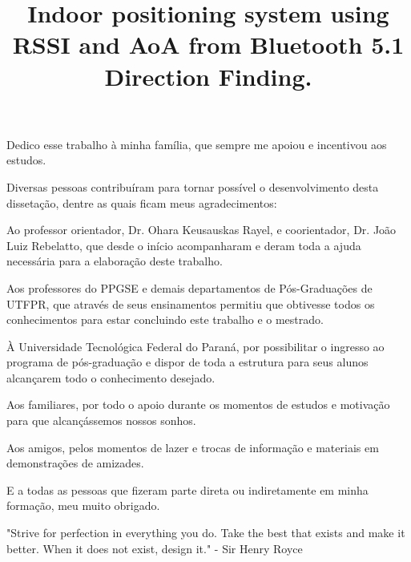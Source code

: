 \documentclass[openright]{normas-utf-tex} %
\title{Indoor positioning system using RSSI and AoA from Bluetooth 5.1 Direction Finding.} %
\begin{document}
\pdfstringdefDisableCommands{%
	\let\MakeUppercase\relax
}
\capa %
\folhaderosto %


%


\begin{dedicatoria}
Dedico esse trabalho à minha família, que sempre me apoiou e incentivou aos estudos.
\end{dedicatoria}

\begin{agradecimentos}
Diversas pessoas contribuíram para tornar possível o desenvolvimento desta dissetação, dentre as quais ficam meus agradecimentos:

Ao professor orientador, Dr. Ohara Keusauskas Rayel, e coorientador, Dr. João Luiz Rebelatto, que desde o início acompanharam e deram toda a ajuda necessária para a elaboração deste trabalho.

Aos professores do PPGSE e demais departamentos de Pós-Graduações de UTFPR, que através de seus ensinamentos permitiu que obtivesse todos os conhecimentos para estar concluindo este trabalho e o mestrado.

À Universidade Tecnológica Federal do Paraná, por possibilitar o ingresso ao programa de pós-graduação e dispor de toda a estrutura para seus alunos  alcançarem todo o conhecimento desejado.

Aos familiares, por todo o apoio durante os momentos de estudos e motivação para que alcançássemos nossos sonhos.

Aos amigos, pelos momentos de lazer e trocas de informação e materiais em demonstrações de amizades.

E a todas as pessoas que fizeram parte direta ou indiretamente em minha formação, meu muito obrigado.
\end{agradecimentos}

\begin{epigrafe}
"Strive for perfection in everything you do. Take the best that exists and make it better. When it does not exist, design it." - Sir Henry Royce
\end{epigrafe}
\end{document}

